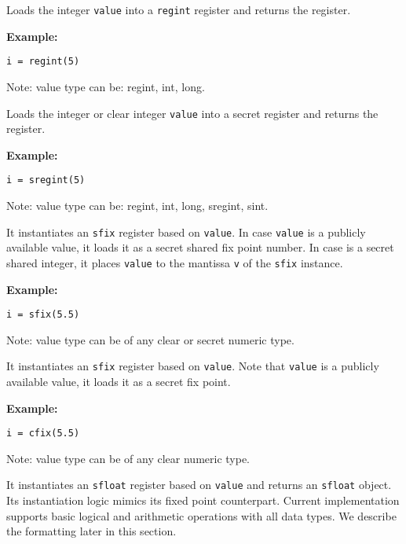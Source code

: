 Loads the integer \verb|value| into a \verb|regint| register and returns 
the register.

\noindent
\textbf{Example:}
\begin{lstlisting}
i = regint(5)
\end{lstlisting}
\begin{footnotesize}
Note: value type can be: regint, int, long.
\end{footnotesize}

Loads the integer or clear integer \verb|value| into a secret register and returns the register.

\noindent
\textbf{Example:}
\begin{lstlisting}
i = sregint(5)
\end{lstlisting}
\begin{footnotesize}
Note: value type can be: regint, int, long, sregint, sint.
\end{footnotesize}

It instantiates  an \verb|sfix| register based on \verb|value|. In case \verb|value| is a publicly available value, it loads it as a secret shared fix point number. In case is a secret shared integer, it places \verb|value| to the mantissa \verb|v| of the \verb|sfix| instance. 

\noindent
\textbf{Example:}
\begin{lstlisting}
i = sfix(5.5)
\end{lstlisting}
\begin{footnotesize}
Note: value type can be of any clear or secret numeric type.
\end{footnotesize}

It instantiates  an \verb|sfix| register based on \verb|value|. 
Note that \verb|value| is a publicly available value, it loads it as a secret fix point. 

\noindent
\textbf{Example:}
\begin{lstlisting}
i = cfix(5.5)
\end{lstlisting}
\begin{footnotesize}
Note: value type can be of any clear numeric type.
\end{footnotesize}


It instantiates  an \verb|sfloat| register based on \verb|value| and returns an \verb|sfloat| object. 
Its instantiation logic mimics its fixed point counterpart. 
Current implementation supports basic logical and arithmetic operations with all data types.
We describe the formatting later in this section.

